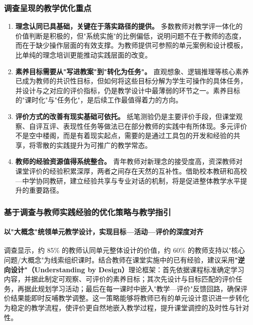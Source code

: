 \documentclass[UTF8,a4paper,12pt,twoside]{ctexart}
\begin{document}
\subsubsection{调查呈现的教学优化重点}

\begin{enumerate}
\item \textbf{理念认同已具基础，关键在于落实路径的提供。} 多数教师对教学评一体化的价值判断是积极的，但"系统实施"的比例偏低，说明问题不在于教师的态度，而在于缺少操作层面的有效支撑。为教师提供可参照的单元案例和设计模板，比单纯的理念培训更能推动实践层面的改变。
\item \textbf{素养目标需要从"写进教案"到"转化为任务"。} 直观想象、逻辑推理等核心素养已成为教师的共识性目标，但如何将这些目标分解为学生可操作的具体任务，并设计与之对应的评价指标，仍是教学设计中最薄弱的环节之一。素养目标的"课时化"与"任务化"，是后续工作最值得着力的方向。
\item \textbf{评价方式的改善有现实基础可依托。} 纸笔测验仍是主要评价手段，但课堂观察、自评互评、表现性任务等做法已在部分教师的实践中有所体现。多元评价不是空中楼阁，而是有着现实起点，需要的是通过工具包的开发和经验的共享，将零散的实践提升为可推广的教学常态。
\item \textbf{教师的经验资源值得系统整合。} 青年教师对新理念的接受度高，资深教师对课堂评价的经验积累深厚，两者之间存在天然的互补性。借助校本教研和高校—中学协同教研，建立经验共享与专业对话的机制，将是促进整体教学水平提升的重要路径。
\end{enumerate}

\subsubsection{基于调查与教师实践经验的优化策略与教学指引}

\paragraph{以"大概念"统领单元教学设计，实现目标—活动—评价的深度对齐}

调查显示，约 85\% 的教师认同单元整体设计的价值，约 60\% 的教师支持以"核心问题/大概念"为线索组织课时。结合教师在课堂实施中的已有经验，建议采用\textbf{"逆向设计"（Understanding by Design）}理论框架：首先依据课程标准确定学习内容，并据此制定可观察、可评价的素养目标；其次先设计与目标匹配的评价任务，再据此规划学习活动；最后在每一课时中嵌入"教学—评价"反馈回路，确保评价结果能即时反哺教学调整。这一策略能够将教师已有的单元设计意识进一步转化为稳定的教学流程，使评价更自然地嵌入教学过程，提升课堂调控的及时性与针对性。
\end{document}
